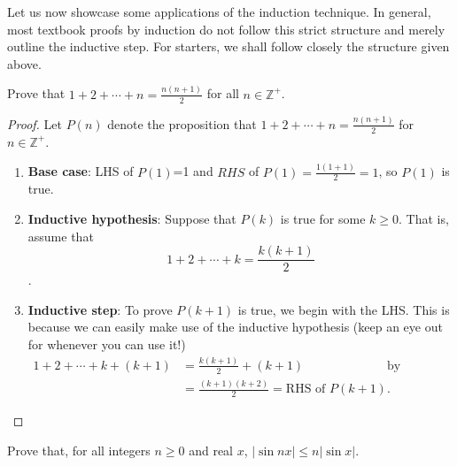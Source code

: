 \documentclass[../main.tex]{subfiles}
\begin{document}
Let us now showcase some applications of the induction technique. In general, most textbook proofs by induction do not follow this strict structure and merely outline the inductive step. For starters, we shall follow closely the structure given above.
\begin{example}[Classic]
    Prove that $1+2+\cdots+n=\frac{n(n+1)}{2}$ for all $n\in\mathbb{Z}^+$.
\end{example}
\begin{proof}
    Let $P(n)$ denote the proposition that $1+2+\cdots+n=\frac{n(n+1)}{2}$ for $n\in\mathbb{Z}^+$.

    \begin{enumerate}
        \item \textbf{Base case}: LHS of $P(1)$=1 and $RHS$ of $P(1)=\frac{1(1+1)}{2}=1$, so $P(1)$ is true.
        \item \textbf{Inductive hypothesis}: Suppose that $P(k)$ is true for some $k\geq 0$. That is, assume that $$1+2+\cdots+k=\frac{k(k+1)}{2}$$.
        \item \textbf{Inductive step}: To prove $P(k+1)$ is true, we begin with the LHS. This is because we can easily make use of the inductive hypothesis (keep an eye out for whenever you can use it!)
        \begin{align*}
            1+2+\cdots+k+(k+1) &= \frac{k(k+1)}{2}+(k+1) &\text{by inductive hypothesis} \\
            &=\frac{(k+1)(k+2)}{2} =\text{RHS of $P(k+1)$.}
        \end{align*} 
    \end{enumerate}
\end{proof}
\begin{example}[Classic]
    Prove that, for all integers $n \geq 0$ and real $x$, $|\sin{nx}|\leq n|\sin{x}|$.
\end{example}
\end{document}
